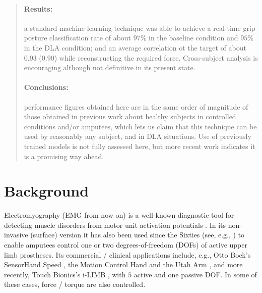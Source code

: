 \documentclass[10pt]{bmc_article}
\newenvironment{bmcformat}{\begin{raggedright}\baselineskip20pt\sloppy\setboolean{publ}{false}}{\end{raggedright}\baselineskip20pt\sloppy}
\begin{document}
\begin{bmcformat}
\begin{abstract}
\paragraph*{Results:}

a standard machine learning technique was able to achieve a real-time grip
posture classification rate of about $97\%$ in the baseline condition and
$95\%$ in the DLA condition; and an average correlation ot the target of
about $0.93$ ($0.90$) while reconstructing the required force. Cross-subject analysis
is encouraging although not definitive in its present state.

\paragraph*{Conclusions:}

performance figures obtained here are in the same order of magnitude of
those obtained in previous work about healthy subjects in controlled conditions
and/or amputees, which lets us claim that this technique can be used
by reasonably any subject, and in DLA situations. Use of previously trained
models is not fully assessed here, but more recent work indicates it is a
promising way ahead.

\end{abstract}


\section*{Background}
\label{sec:introduction}

Electromyography (EMG from now on) is a well-known diagnostic tool
for detecting muscle disorders from motor unit activation potentials
\cite{deluca97,deluca02}. In its non-invasive (surface) version it
has also been used since the Sixties
(see, e.g., \cite{bottomley65,childress69,sears})
to enable amputees control one or two degrees-of-freedom (DOFs)
of active upper limb prostheses. Its commercial / clinical applications
include, e.g., Otto Bock's SensorHand Speed \cite{sensorhand}, the Motion
Control Hand and the Utah Arm \cite{mchand}, and more recently,
Touch Bionics's i-LIMB \cite{ilimb}, with $5$ active and one passive DOF.
In some of these cases, force / torque are also controlled.


\end{bmcformat}
\end{document}
